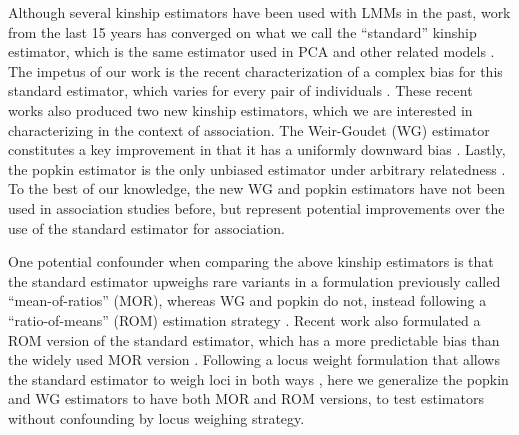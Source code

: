 \documentclass[11pt]{article}
\begin{document}
Although several kinship estimators have been used with LMMs in the past, work from the last 15 years has converged on what we call the ``standard'' kinship estimator, which is the same estimator used in PCA and other related models \citep{price_principal_2006, astle_population_2009, rakovski_kinship-based_2009, thornton_roadtrips:_2010, yang_common_2010, yang_gcta:_2011, zhou_genome-wide_2012, speed_improved_2012, yang_advantages_2014, speed_relatedness_2015, loh_efficient_2015, wang_efficient_2017, sul_population_2018}.
The impetus of our work is the recent characterization of a complex bias for this standard estimator, which varies for every pair of individuals \citep{weir_unified_2017, ochoa_estimating_2021}.
These recent works also produced two new kinship estimators, which we are interested in characterizing in the context of association.
The Weir-Goudet (WG) estimator constitutes a key improvement in that it has a uniformly downward bias \citep{weir_unified_2017, ochoa_estimating_2021}.
Lastly, the popkin estimator is the only unbiased estimator under arbitrary relatedness \citep{ochoa_estimating_2021}.
To the best of our knowledge, the new WG and popkin estimators have not been used in association studies before, but represent potential improvements over the use of the standard estimator for association.

One potential confounder when comparing the above kinship estimators is that the standard estimator upweighs rare variants in a formulation previously called ``mean-of-ratios'' (MOR), whereas WG and popkin do not, instead following a ``ratio-of-means'' (ROM) estimation strategy \citep{bhatia_estimating_2013, ochoa_estimating_2021}.
Recent work also formulated a ROM version of the standard estimator, which has a more predictable bias than the widely used MOR version \citep{ochoa_estimating_2021}.
Following a locus weight formulation that allows the standard estimator to weigh loci in both ways \citep{wang_efficient_2017}, here we generalize the popkin and WG estimators to have both MOR and ROM versions, to test estimators without confounding by locus weighing strategy.
\end{document}

